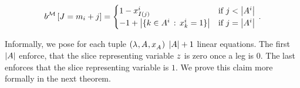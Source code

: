 \begin{align}
    \label{eq:ilpRhs}
    \rhsofat{\sliceset}{\datvariable=\datanum_{\decindex}+\datindex} =
    \begin{cases}
        1 - \catindexof{\indexinterpretationat{\datindex}}^{\decindex} & \text{if }  \datindex < \cardof{\variablesetof{\decindex}} \\ %
        -1 + \cardof{\{\catenumerator\in\variablesetof{\decindex} \, : \,  \catindexof{\catenumerator}^{\decindex} = 1\}}  & \text{if }  \datindex = \cardof{\variablesetof{\decindex}} \\ %
    \end{cases} \, .
\end{align}


Informally, we pose for each tuple $(\lambda^{}, A^{}, x_{A^{}}^{})$ $\left|A\right|+1$ linear equations.
The first $\left|A\right|$ enforce, that the slice representing variable $z$ is zero once a leg is $0$.
The last enforces that the slice representing variable is $1$.
We prove this claim more formally in the next theorem.

